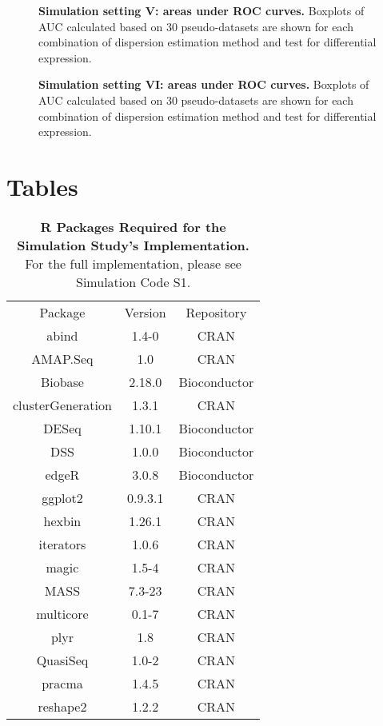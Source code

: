 \documentclass[10pt]{article}
\begin{document}
\begin{figure}[!ht] %
   \centering
   \caption{{\bf Simulation setting V: areas under ROC curves.} Boxplots of AUC calculated based on 30 pseudo-datasets are shown for each combination of dispersion estimation method and test for differential expression.} %
   \label{fig:auc5}
\end{figure}

\begin{figure}[!ht] %
   \centering
   \caption{{\bf Simulation setting VI: areas under ROC curves.} Boxplots of AUC calculated based on 30 pseudo-datasets are shown for each combination of dispersion estimation method and test for differential expression.} %
   \label{fig:auc6}
\end{figure}


\clearpage

\section*{Tables}

\begin{table}[!ht] %
   \centering
   \caption{{\bf R Packages Required for the Simulation Study's Implementation.} For the full implementation, please see Simulation Code S1.} %
\begin{tabular}{|c|c|c|}
Package & Version & Repository \\
  abind & 1.4-0 &CRAN\\
  AMAP.Seq & 1.0 &CRAN\\
  Biobase & 2.18.0 &Bioconductor\\
  clusterGeneration & 1.3.1 &CRAN\\
  DESeq & 1.10.1 &Bioconductor\\
  DSS & 1.0.0 &Bioconductor\\
  edgeR & 3.0.8 &Bioconductor\\
  ggplot2 & 0.9.3.1 &CRAN\\
  hexbin & 1.26.1 &CRAN\\
  iterators & 1.0.6 &CRAN\\
  magic & 1.5-4 &CRAN\\
  MASS & 7.3-23 &CRAN\\
  multicore & 0.1-7 &CRAN\\
  plyr & 1.8 &CRAN\\
  QuasiSeq & 1.0-2 &CRAN\\
  pracma & 1.4.5 &CRAN\\
  reshape2 & 1.2.2 &CRAN\\
\end{tabular}
\label{tab:software}
\end{table}
\end{document}
